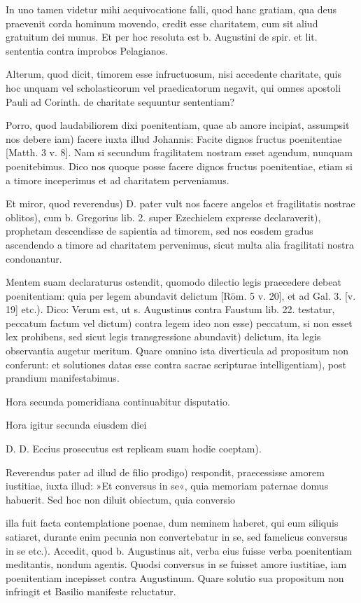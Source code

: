 In uno tamen videtur mihi aequivocatione falli, quod hanc gratiam, qua deus praevenit corda hominum movendo, credit esse charitatem, cum sit aliud gratuitum dei munus. Et per hoc resoluta est b. Augustini de spir. et lit. sententia contra improbos Pelagianos.

Alterum, quod dicit, timorem esse infructuosum, nisi accedente charitate, quis hoc unquam vel scholasticorum vel praedicatorum negavit, qui omnes apostoli Pauli ad Corinth. de charitate sequuntur sententiam?

\marginpar{\small[365]} Porro, quod laudabiliorem dixi poenitentiam, quae ab amore incipiat, assumpsit nos debere iam) facere iuxta illud Johannis: Facite dignos fructus poenitentiae [Matth. 3 v. 8]. Nam si secundum fragilitatem nostram esset agendum, nunquam poenitebimus. Dico nos quoque posse facere dignos fructus poenitentiae, etiam si a timore inceperimus et ad charitatem perveniamus.

Et miror, quod reverendus) D. pater vult nos facere angelos et fragilitatis nostrae oblitos), cum b. Gregorius lib. 2. super Ezechielem expresse declaraverit), prophetam descendisse de sapientia ad timorem, sed nos eosdem gradus ascendendo a timore ad charitatem pervenimus, sicut multa alia fragilitati nostra condonantur.

Mentem suam declaraturus ostendit, quomodo dilectio legis praecedere debeat poenitentiam: quia per legem abundavit delictum [Röm. 5 v. 20], et ad Gal. 3. [v. 19] etc.). Dico: Verum est, ut s. Augustinus contra Faustum lib. 22. testatur, peccatum factum vel dictum) contra legem ideo non esse) peccatum, si non esset lex prohibens, sed sicut legis transgressione abundavit) delictum, ita legis observantia augetur meritum. Quare omnino ista diverticula ad propositum non conferunt: et solutiones datas esse contra sacrae scripturae intelligentiam), post prandium manifestabimus.

Hora secunda pomeridiana continuabitur disputatio.

Hora igitur secunda eiusdem diei

D. D. Eccius prosecutus est replicam suam hodie coeptam).

Reverendus pater ad illud de filio prodigo) respondit, praecessisse amorem iustitiae, iuxta illud: »Et conversus in se«, quia memoriam paternae domus habuerit. Sed hoc non diluit obiectum, quia conversio

illa fuit facta contemplatione poenae, dum neminem haberet, qui eum siliquis satiaret, durante enim pecunia non convertebatur in se, sed famelicus conversus in se etc.). Accedit, quod b. Augustinus ait, verba eius fuisse verba poenitentiam meditantis, nondum agentis. Quodsi conversus in se fuisset amore iustitiae, iam poenitentiam incepisset contra Augustinum. Quare solutio sua propositum non infringit et Basilio manifeste reluctatur.


